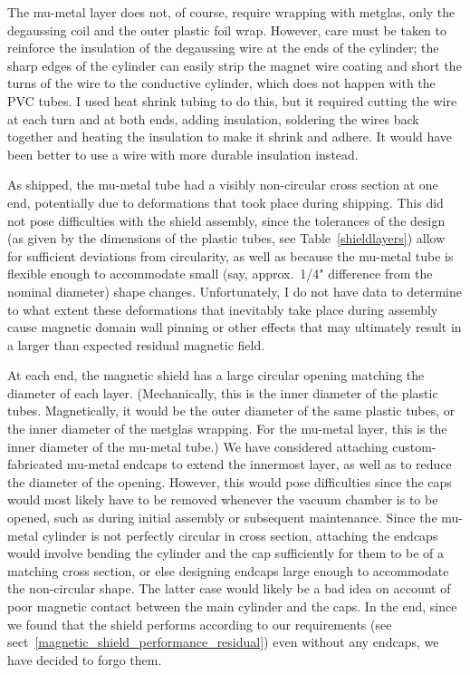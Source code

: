 The mu-metal layer does not, of course, require wrapping with metglas, only the
degaussing coil and the outer plastic foil wrap. However, care must be taken to
reinforce the insulation of the degaussing wire at the ends of the cylinder; the
sharp edges of the cylinder can easily strip the magnet wire coating and short
the turns of the wire to the conductive cylinder, which does not happen with the
PVC tubes. I used heat shrink tubing to do this, but it required cutting the
wire at each turn and at both ends, adding insulation, soldering the wires back
together and heating the insulation to make it shrink and adhere. It would have
been better to use a wire with more durable insulation instead.

As shipped, the mu-metal tube had a visibly non-circular cross section at one
end, potentially due to deformations that took place during shipping. This did
not pose difficulties with the shield assembly, since the tolerances of the
design (as given by the dimensions of the plastic tubes, see
Table~\ref{shieldlayers}) allow for sufficient deviations from circularity, as
well as because the mu-metal tube is flexible enough to accommodate small (say,
approx.\ 1/4" difference from the nominal diameter) shape changes.
Unfortunately, I do not have data to determine to what extent these deformations
that inevitably take place during assembly cause magnetic domain wall pinning or
other effects that may ultimately result in a larger than expected residual
magnetic field.

At each end, the magnetic shield has a large circular opening matching the
diameter of each layer. (Mechanically, this is the inner diameter of the plastic
tubes. Magnetically, it would be the outer diameter of the same plastic tubes,
or the inner diameter of the metglas wrapping. For the mu-metal layer, this is
the inner diameter of the mu-metal tube.) We have considered attaching
custom-fabricated mu-metal endcaps to extend the innermost layer, as well as to
reduce the diameter of the opening. However, this would pose difficulties since
the caps would most likely have to be removed whenever the vacuum chamber is to
be opened, such as during initial assembly or subsequent maintenance. Since the
mu-metal cylinder is not perfectly circular in cross section, attaching the
endcaps would involve bending the cylinder and the cap sufficiently for them to
be of a matching cross section, or else designing endcaps large enough to
accommodate the non-circular shape. The latter case would likely be a bad idea
on account of poor magnetic contact between the main cylinder and the caps. In
the end, since we found that the shield performs according to our requirements
(see sect~\ref{magnetic_shield_performance_residual}) even without any endcaps,
we have decided to forgo them.

